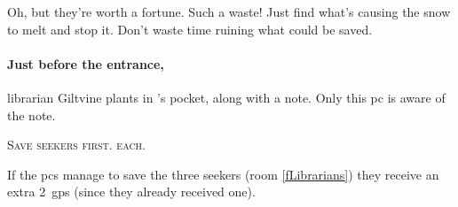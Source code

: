 \begin{speechtext}
  \small
  Oh, but they're worth a fortune.
  Such a waste!
  Just find what's causing the snow to melt and stop it.
  Don't waste time ruining what could be saved.
\end{speechtext}

\paragraph{Just before the entrance,}
\gls{librarian} Giltvine plants  in 's pocket, along with a note.
Only this \gls{pc} is aware of the note.

\begin{speechtext}
  \scshape
  Save \glspl{seeker} first.
   each.
\end{speechtext}

If the \glspl{pc} manage to save the three \glspl{seeker} (room \vref{fLibrarians}) they receive an extra 2~\glspl{gp} (since they already received one).

